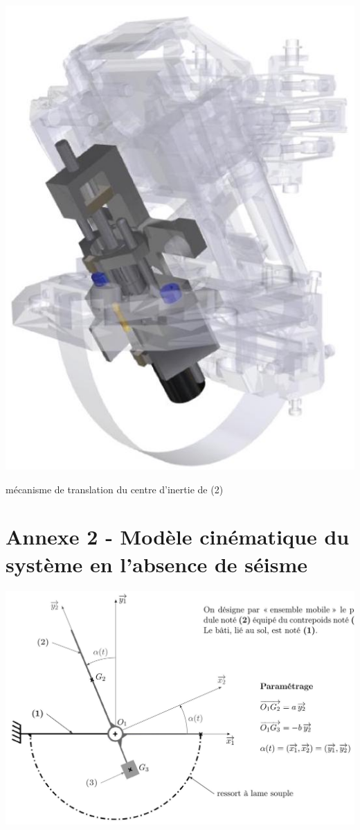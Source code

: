 \documentclass[10pt]{article}
\begin{document}
\begin{center}
\includegraphics[max width=\textwidth]{2024_04_26_3285cfc264024262add0g-15(1)}
\end{center}

mécanisme de translation du centre d'inertie de (2)

\section*{Annexe 2 - Modèle cinématique du système en l'absence de séisme}
\begin{center}
\includegraphics[max width=\textwidth]{2024_04_26_3285cfc264024262add0g-16}
\end{center}
\end{document}
